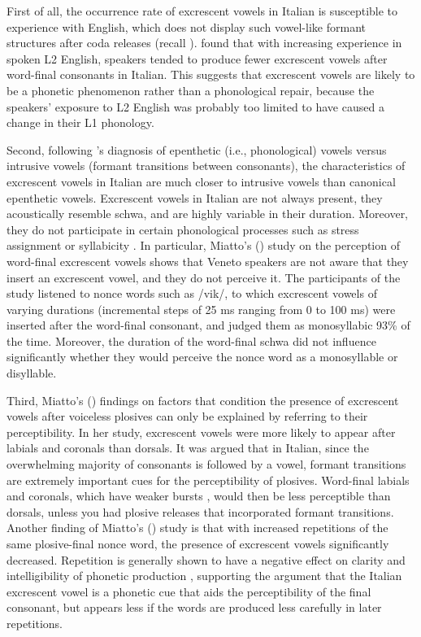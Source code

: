 \documentclass[output=paper,colorlinks,citecolor=brown]{langscibook}
\begin{document}
First of all, the occurrence rate of excrescent vowels in Italian is susceptible to experience with English, which does not display such vowel-like formant structures after coda releases (recall ). \citet{Miattoetal2019} found that with increasing experience in spoken L2 English, speakers tended to produce fewer excrescent vowels after word-final consonants in Italian. This suggests that excrescent vowels are likely to be a phonetic phenomenon rather than a phonological repair, because the speakers’ exposure to L2 English was probably too limited to have caused a change in their L1 phonology.

Second, following \citet{Hall2006, Hall2011}’s diagnosis of epenthetic (i.e., phonological) vowels versus intrusive vowels (formant transitions between consonants), the characteristics of excrescent vowels in Italian are much closer to intrusive vowels than canonical epenthetic vowels. Excrescent vowels in Italian are not always present, they acoustically resemble schwa, and are highly variable in their duration. Moreover, they do not participate in certain phonological processes such as stress assignment \citep{Repetti2012} or syllabicity \citep{Miatto2020}. In particular, Miatto’s (\citeyear{Miatto2020}) study on the perception of word-final excrescent vowels shows that Veneto speakers are not aware that they insert an excrescent vowel, and they do not perceive it. The participants of the study listened to nonce words such as /vik/, to which excrescent vowels of varying durations (incremental steps of 25 ms ranging from 0 to 100 ms) were inserted after the word-final consonant, and judged them as monosyllabic 93\% of the time. Moreover, the duration of the word-final schwa did not influence significantly whether they would perceive the nonce word as a monosyllable or disyllable. 

Third, Miatto’s (\citeyear{Miatto2022}) findings on factors that condition the presence of excrescent vowels after voiceless plosives can only be explained by referring to their perceptibility. In her study, excrescent vowels were more likely to appear after labials and coronals than dorsals. It was argued that in Italian, since the overwhelming majority of consonants is followed by a vowel, formant transitions are extremely important cues for the perceptibility of plosives. Word-final labials and coronals, which have weaker bursts \citep{Dormanetal1977}, would then be less perceptible than dorsals, unless you had plosive releases that incorporated formant transitions. Another finding of Miatto’s (\citeyear{Miatto2022}) study is that with increased repetitions of the same plosive-final nonce word, the presence of excrescent vowels significantly decreased. Repetition is generally shown to have a negative effect on clarity and intelligibility of phonetic production \citep{FowlerHousum1987}, supporting the argument that the Italian excrescent vowel is a phonetic cue that aids the perceptibility of the final consonant, but appears less if the words are produced less carefully in later repetitions. 
\end{document}
